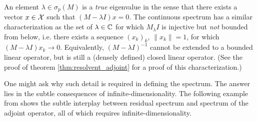 An element $\lambda \in \sigma_p (M)$ is a \emph{true} eigenvalue in the sense that there 
exists a vector $x \in \mathcal{X}$ such that $(M - \lambda I) x = 0$. The continuous spectrum 
has a similar characterization as the set of $\lambda \in \mathbb{C}$ for which $M _ \lambda I$ 
is injective but \emph{not} bounded from below, i.e. there exists a sequence $(x_k)_k$, 
$\| x_k \| = 1$, for which $(M - \lambda I) x_k \to 0$. Equivalently, 
$(M - \lambda I)^{-1}$ cannot be extended to a bounded linear operator, but is still a 
(densely defined) closed linear operator. (See the proof of theorem 
\ref{thm:resolvent_adjoint} for a proof of this characterization.)

One might ask why such detail is required in defining the spectrum. The answer lies in 
the subtle consequences of infinite-dimensionality. The following example from 
\cite{spectraexample} shows the subtle interplay between residual spectrum and spectrum 
of the adjoint operator, all of which requires infinite-dimensionality. 

